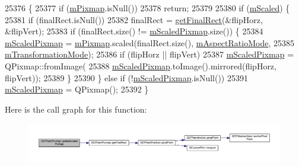 \begin{DoxyCode}
25376                                                       \{
25377   \textcolor{keywordflow}{if} (\hyperlink{class_q_c_p_item_pixmap_a1396cce7f26c7b8e9512906284380c4d}{mPixmap}.isNull())
25378     \textcolor{keywordflow}{return};
25379 
25380   \textcolor{keywordflow}{if} (\hyperlink{class_q_c_p_item_pixmap_a8fe670a529cd46a9b8afd9fc1203bc3f}{mScaled}) \{
25381     \textcolor{keywordflow}{if} (finalRect.isNull())
25382       finalRect = \hyperlink{class_q_c_p_item_pixmap_a245ef0c626cab7096a810442f2f6a2d9}{getFinalRect}(&flipHorz, &flipVert);
25383     \textcolor{keywordflow}{if} (finalRect.size() != \hyperlink{class_q_c_p_item_pixmap_a2ebc66e15b9f1264563d58f29ba1bc00}{mScaledPixmap}.size()) \{
25384       \hyperlink{class_q_c_p_item_pixmap_a2ebc66e15b9f1264563d58f29ba1bc00}{mScaledPixmap} = \hyperlink{class_q_c_p_item_pixmap_a1396cce7f26c7b8e9512906284380c4d}{mPixmap}.scaled(finalRect.size(), 
      \hyperlink{class_q_c_p_item_pixmap_a8dc6b6c1e106ac523efae22d5fe55bab}{mAspectRatioMode},
25385                                      \hyperlink{class_q_c_p_item_pixmap_ac9ecad3b9842363754e32eda2cf821bd}{mTransformationMode});
25386       \textcolor{keywordflow}{if} (flipHorz || flipVert)
25387         \hyperlink{class_q_c_p_item_pixmap_a2ebc66e15b9f1264563d58f29ba1bc00}{mScaledPixmap} = QPixmap::fromImage(
25388             \hyperlink{class_q_c_p_item_pixmap_a2ebc66e15b9f1264563d58f29ba1bc00}{mScaledPixmap}.toImage().mirrored(flipHorz, flipVert));
25389     \}
25390   \} \textcolor{keywordflow}{else} \textcolor{keywordflow}{if} (!\hyperlink{class_q_c_p_item_pixmap_a2ebc66e15b9f1264563d58f29ba1bc00}{mScaledPixmap}.isNull())
25391     \hyperlink{class_q_c_p_item_pixmap_a2ebc66e15b9f1264563d58f29ba1bc00}{mScaledPixmap} = QPixmap();
25392 \}
\end{DoxyCode}


Here is the call graph for this function\+:\nopagebreak
\begin{figure}[H]
\begin{center}
\leavevmode
\includegraphics[width=350pt]{class_q_c_p_item_pixmap_a8bced3027b326b290726cd1979c7cfc6_cgraph}
\end{center}
\end{figure}




